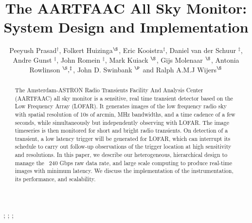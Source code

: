 \documentclass{ws-jai}
\begin{document}
\catchline{}{}{}{}{} %


\title{The AARTFAAC All Sky Monitor: System Design and Implementation}

\author{Peeyush      Prasad$^\dagger$,      Folkert     Huizinga$^\S$,      Eric
  Kooistra$^\ddagger$,   Daniel  van   der  Schuur   $^\ddagger$,  Andre   Gunst
  $^\ddagger$, John Romein $^\ddagger$, Mark  Kuiack $^\S$, Gijs Molenaar $^\S$,
  Antonia Rowlinson $^\S,^\ddagger$, John D. Swinbank $^\P$ and Ralph A.M.J Wijers$^\S$}

\address{ $^\dagger$Anton Pannekoek Institute,  University of Amsterdam, Postbus
  94249        1090        GE,         Amsterdam,        The        Netherlands,
  p.prasad@uva.nl\\   $^\ddagger$ASTRON,  Oude   Hoogeveensedijk,  7991PD,   The
  Netherlands\\ $^\S$Anton Pannekoek Institute, University of Amsterdam, Postbus
  94249 1090  GE, Amsterdam, The Netherlands\\  $^\P$Department of Astrophysical
  Sciences, Princeton University, Princeton, NJ 08544, USA\\ }

\maketitle


\begin{history}
;
;
;
\end{history}

\begin{abstract}
The Amsterdam-ASTRON  Radio Transients  Facility And Analysis  Center (AARTFAAC)
all sky monitor  is a sensitive, real  time transient detector based  on the Low
Frequency Array  (LOFAR).  It generates  images of  the low frequency  radio sky
with spatial resolution of 10s of arcmin,  MHz bandwidths, and a time cadence of
a few seconds, while simultaneously but independently observing with LOFAR.  The
image timeseries  is then monitored  for short  and bright radio  transients. On
detection of  a transient, a  low latency trigger  will be generated  for LOFAR,
which can  interrupt its  schedule to  carry out  follow-up observations  of the
trigger  location  at high  sensitivity  and  resolutions.   In this  paper,  we
describe our heterogeneous, hierarchical design to manage the ~240 Gbps raw data
rate,  and  large scale  computing  to  produce  real-time images  with  minimum
latency.  We discuss the implementation of the instrumentation, its performance,
and scalability.
\end{abstract}
\end{document}
